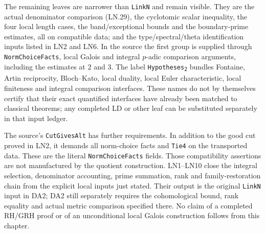 The remaining leaves are narrower than \texttt{LinkN} and remain
visible.  They are the actual denominator comparison (LN.29),
the cyclotomic scalar inequality, the four local length cases,
the band/exceptional bounds and the boundary-prime estimates,
all on compatible data; and the type/spectral/theta identification
inputs listed in LN2 and LN6.  In the source the first group is
supplied through \texttt{NormChoiceFacts}, local Galois and
integral $p$-adic comparison arguments, including the estimates
at $2$ and $3$.  The label \texttt{Hypotheses\textsubscript{2}}
bundles Fontaine, Artin reciprocity, Bloch--Kato, local duality,
local Euler characteristic, local finiteness and integral
comparison interfaces.  These names do not by themselves certify
that their exact quantified interfaces have already been matched
to classical theorems; any completed LD or other leaf can be
substituted separately in that input ledger.

The source's \texttt{CutGivesAlt} has further requirements.
In addition to the good cut proved in LN2, it demands all norm-choice
facts and \texttt{Tie4} on the transported data.  These are the
literal \texttt{NormChoiceFacts} fields.  Those compatibility assertions
are not manufactured by the quotient construction.  LN1--LN10
close the integral selection, denominator accounting, prime
summation, rank and family-restoration chain from the explicit
local inputs just stated.  Their output is the original
\texttt{LinkN} input in DA2; DA2 still separately requires the
cohomological bound, rank equality and actual metric comparison
specified there.  No claim of a completed RH/GRH proof or of an
unconditional local Galois construction follows from this chapter.
